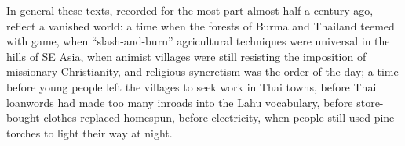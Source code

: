 In general these texts, recorded for the most part almost half a century ago, reflect a vanished world: a time when the forests of Burma and Thailand teemed with game, when “slash-and-burn” agricultural techniques were universal in the hills of SE Asia, when animist villages were still resisting the imposition of missionary Christianity, and religious syncretism was the order of the day; a time before young people left the villages to seek work in Thai towns, before Thai loanwords had made too many inroads into the Lahu vocabulary, before store-bought clothes replaced homespun, before electricity, when people still used pine-torches to light their way at night.

